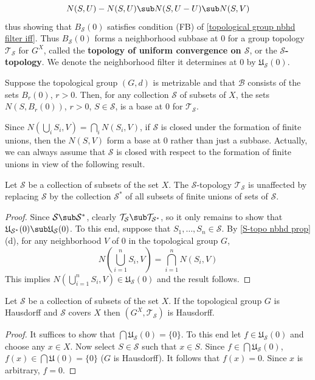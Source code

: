 \[N(S,U)-N(S,U)\sub N(S,U-U)\sub N(S,V)\]
thus showing that $B_{\mathcal{S}}(0)$ satisfies condition (FB) of \cref{topological group nbhd filter iff}. Thus $B_{\mathcal{S}}(0)$ forms a neighborhood subbase at $0$ for a group topology $\mathcal{T}_{\mathcal{S}}$ for $G^X$, called the \textbf{topology of uniform convergence on $\mathcal{S}$}, or the \textbf{$\mathcal{S}$-topology}. We denote the neighborhood filter it determines at $0$ by $\mathfrak{U}_{\mathcal{S}}(0)$.\par
Suppose the topological group $(G,d)$ is metrizable and that $\mathcal{B}$ consists of the sets $B_r(0)$, $r>0$. Then, for any collection $\mathcal{S}$ of subsets of $X$, the sets $N(S,B_r(0))$, $r>0$, $S\in\mathcal{S}$, is a base at $0$ for $\mathcal{T}_{\mathcal{S}}$.\par 
Since $N(\bigcup_iS_i,V)=\bigcap_iN(S_i,V)$, if $\mathcal{S}$ is closed under the formation of finite unions, then the $N(S,V)$ form a base at $0$ rather than just a subbase. Actually, we can always assume that $\mathcal{S}$ is closed with respect to the formation of finite unions in view of the following result.
\begin{proposition}\label{S-topo operation on generating set}
Let $\mathcal{S}$ be a collection of subsets of the set $X$. The $\mathcal{S}$-topology $\mathcal{T}_{\mathcal{S}}$ is unaffected by replacing $\mathcal{S}$ by the collection $\mathcal{S}^*$ of all subsets of finite unions of sets of $\mathcal{S}$.
\end{proposition}
\begin{proof}
Since $\mathcal{S}\sub\mathcal{S}^*$, clearly $\mathcal{T}_{\mathcal{S}}\sub\mathcal{T}_{\mathcal{S}^*}$, so it only remains to show that $\mathfrak{U}_{\mathcal{S}^*}(0)\sub\mathfrak{U}_{\mathcal{S}}(0)$. To this end, suppose that $S_1,\dots,S_n\in\mathcal{S}$. By \cref{S-topo nbhd prop}(d), for any neighborhood $V$ of $0$ in the topological group $G$,
\[N(\bigcup_{i=1}^{n}S_i,V)=\bigcap_{i=1}^{n}N(S_i,V)\]
This implies $N(\bigcup_{i=1}^{n}S_i,V)\in\mathfrak{U}_{\mathcal{S}}(0)$ and the result follows.
\end{proof}
\begin{proposition}\label{S-topo Hausdorff if}
Let $\mathcal{S}$ be a collection of subsets of the set $X$. If the topological group $G$ is Hausdorff and $\mathcal{S}$ covers $X$ then $(G^X,\mathcal{T}_{\mathcal{S}})$ is Hausdorff.
\end{proposition}
\begin{proof}
It suffices to show that $\bigcap\mathfrak{U}_{\mathcal{S}}(0)=\{0\}$. To this end let $f\in\mathfrak{U}_{\mathcal{S}}(0)$ and choose any $x\in X$. Now select $S\in\mathcal{S}$ such that $x\in S$. Since $f\in\bigcap\mathfrak{U}_{\mathcal{S}}(0)$, $f(x)\in\bigcap\mathfrak{U}(0)=\{0\}$ ($G$ is Hausdorff). It follows that $f(x)=0$. Since $x$ is arbitrary, $f=0$.
\end{proof}
